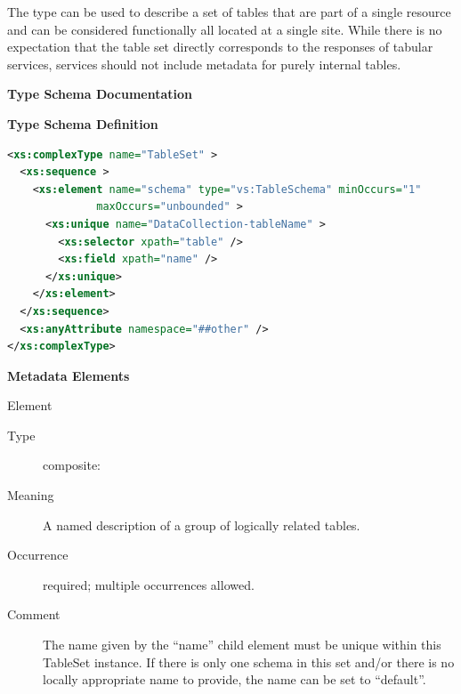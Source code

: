 \documentclass[11pt,a4paper]{ivoa}
\begin{document}
The  type can be used
to describe a set of tables that are part of a single resource and can
be considered functionally all located at a single site.  While there is
no expectation that the table set directly corresponds to the responses
of tabular services,
services should not include metadata for purely internal
tables.



\begin{generated}
\begingroup
        \renewcommand*\descriptionlabel[1]{%
        \hbox to 5.5em{\emph{#1}\hfil}}\vspace{2ex}\noindent\textbf{ Type Schema Documentation}


\vspace{1ex}\noindent\textbf{ Type Schema Definition}

\begin{lstlisting}[language=XML,basicstyle=\footnotesize]
<xs:complexType name="TableSet" >
  <xs:sequence >
    <xs:element name="schema" type="vs:TableSchema" minOccurs="1"
              maxOccurs="unbounded" >
      <xs:unique name="DataCollection-tableName" >
        <xs:selector xpath="table" />
        <xs:field xpath="name" />
      </xs:unique>
    </xs:element>
  </xs:sequence>
  <xs:anyAttribute namespace="##other" />
</xs:complexType>
\end{lstlisting}

\vspace{0.5ex}\noindent\textbf{ Metadata Elements}

\begingroup\small\begin{bigdescription}\item[Element \xmlel{schema}]
\begin{description}
\item[Type] composite: 
\item[Meaning]
                A named description of a group of logically related tables.

\item[Occurrence] required; multiple occurrences allowed.
\item[Comment]
                The name given by the “name” child element must
                be unique within this TableSet instance.  If there is
                only one schema in this set and/or there is no locally
                appropriate name to provide, the name can be set to
                “default”.


\end{description}
\end{bigdescription}
\end{generated}
\end{document}
